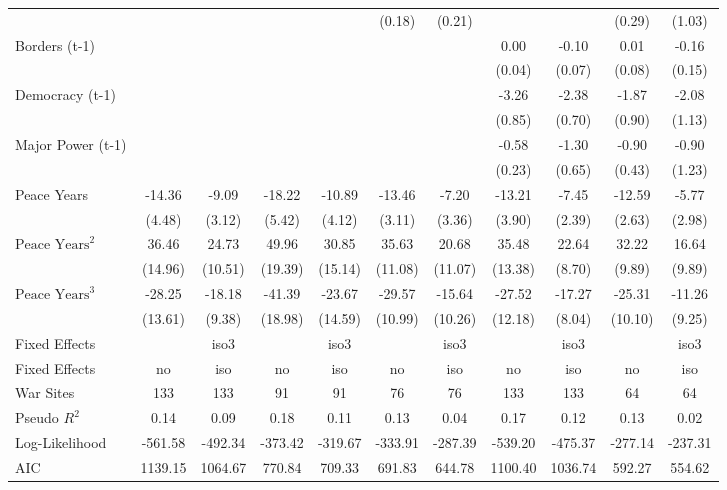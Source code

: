 \begin{tabular}{lcccccccccc}
&  &  &  &  & (0.18) & (0.21) &  &  & (0.29) & (1.03) \\
Borders (t-1) &  &  &  &  &  &  & 0.00 & -0.10 & 0.01 & -0.16 \\
&  &  &  &  &  &  & (0.04) & (0.07) & (0.08) & (0.15) \\
Democracy (t-1) &  &  &  &  &  &  & -3.26 & -2.38 & -1.87 & -2.08 \\
&  &  &  &  &  &  & (0.85) & (0.70) & (0.90) & (1.13) \\
Major Power (t-1) &  &  &  &  &  &  & -0.58 & -1.30 & -0.90 & -0.90 \\
&  &  &  &  &  &  & (0.23) & (0.65) & (0.43) & (1.23) \\
Peace Years & -14.36 & -9.09 & -18.22 & -10.89 & -13.46 & -7.20 & -13.21 & -7.45 & -12.59 & -5.77 \\
& (4.48) & (3.12) & (5.42) & (4.12) & (3.11) & (3.36) & (3.90) & (2.39) & (2.63) & (2.98) \\
$\text{Peace Years}^2$ & 36.46 & 24.73 & 49.96 & 30.85 & 35.63 & 20.68 & 35.48 & 22.64 & 32.22 & 16.64 \\
& (14.96) & (10.51) & (19.39) & (15.14) & (11.08) & (11.07) & (13.38) & (8.70) & (9.89) & (9.89) \\
$\text{Peace Years}^3$ & -28.25 & -18.18 & -41.39 & -23.67 & -29.57 & -15.64 & -27.52 & -17.27 & -25.31 & -11.26 \\
& (13.61) & (9.38) & (18.98) & (14.59) & (10.99) & (10.26) & (12.18) & (8.04) & (10.10) & (9.25) \\
Fixed Effects &  & iso3 &  & iso3 &  & iso3 &  & iso3 &  & iso3 \\
\midrule
Fixed Effects & no & iso & no & iso & no & iso & no & iso & no & iso \\
War Sites & 133 & 133 & 91 & 91 & 76 & 76 & 133 & 133 & 64 & 64 \\
Pseudo $R^2$ & 0.14 & 0.09 & 0.18 & 0.11 & 0.13 & 0.04 & 0.17 & 0.12 & 0.13 & 0.02 \\
Log-Likelihood & -561.58 & -492.34 & -373.42 & -319.67 & -333.91 & -287.39 & -539.20 & -475.37 & -277.14 & -237.31 \\
AIC & 1139.15 & 1064.67 & 770.84 & 709.33 & 691.83 & 644.78 & 1100.40 & 1036.74 & 592.27 & 554.62 \\
\bottomrule
\end{tabular}
